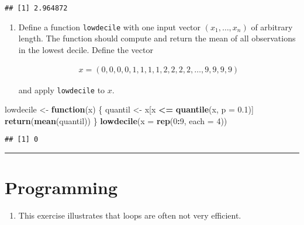 \documentclass[]{article}
\newenvironment{Shaded}{\begin{snugshade}}{\end{snugshade}}
\newcommand{\KeywordTok}[1]{\textcolor[rgb]{0.13,0.29,0.53}{\textbf{#1}}}
\newcommand{\DataTypeTok}[1]{\textcolor[rgb]{0.13,0.29,0.53}{#1}}
\newcommand{\DecValTok}[1]{\textcolor[rgb]{0.00,0.00,0.81}{#1}}
\newcommand{\FloatTok}[1]{\textcolor[rgb]{0.00,0.00,0.81}{#1}}
\newcommand{\StringTok}[1]{\textcolor[rgb]{0.31,0.60,0.02}{#1}}
\newcommand{\ControlFlowTok}[1]{\textcolor[rgb]{0.13,0.29,0.53}{\textbf{#1}}}
\newcommand{\OperatorTok}[1]{\textcolor[rgb]{0.81,0.36,0.00}{\textbf{#1}}}
\newcommand{\NormalTok}[1]{#1}
\providecommand{\tightlist}{%
  \setlength{\itemsep}{0pt}\setlength{\parskip}{0pt}}
\begin{document}
\begin{verbatim}
## [1] 2.964872
\end{verbatim}

\begin{enumerate}
\def\labelenumi{\arabic{enumi}.}
\setcounter{enumi}{1}
\tightlist
\item
  Define a function \texttt{lowdecile} with one input vector
  \(\left(x_{1},\ldots ,x_{n}\right)\) of arbitrary length. The function
  should compute and return the mean of all observations in the lowest
  decile. Define the vector

  \begin{align*}
  x=\left( 0,0,0,0,1,1,1,1,2,2,2,2,\ldots ,9,9,9,9\right)
  \end{align*}

  and apply \texttt{lowdecile} to \(x\).
\end{enumerate}

\begin{Shaded}
\begin{Highlighting}[]
\NormalTok{lowdecile <-}\StringTok{ }\ControlFlowTok{function}\NormalTok{(x) \{}
\NormalTok{  quantil <-}\StringTok{ }\NormalTok{x[x }\OperatorTok{<=}\StringTok{ }\KeywordTok{quantile}\NormalTok{(x, }\DataTypeTok{p =} \FloatTok{0.1}\NormalTok{)]  }
  \KeywordTok{return}\NormalTok{(}\KeywordTok{mean}\NormalTok{(quantil))  }
\NormalTok{\}}
\KeywordTok{lowdecile}\NormalTok{(}\DataTypeTok{x =} \KeywordTok{rep}\NormalTok{(}\DecValTok{0}\OperatorTok{:}\DecValTok{9}\NormalTok{, }\DataTypeTok{each =} \DecValTok{4}\NormalTok{))}
\end{Highlighting}
\end{Shaded}

\begin{verbatim}
## [1] 0
\end{verbatim}

\begin{center}\rule{0.5\linewidth}{\linethickness}\end{center}

\section{Programming}\label{programming}

\begin{enumerate}
\def\labelenumi{\arabic{enumi}.}
\tightlist
\item
  This exercise illustrates that loops are often not very efficient.
\end{enumerate}
\end{document}
